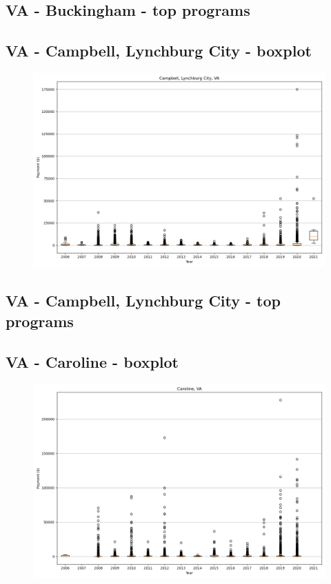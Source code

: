 \subsection*{VA - Buckingham - top programs}

\newpage
\subsection*{VA - Campbell, Lynchburg City - boxplot}
\begin{figure}[h]
\centering
\includegraphics[width=7in]{../output/boxplots/counties/Campbell, Lynchburg City-VA_boxplot.png}
\end{figure}


\subsection*{VA - Campbell, Lynchburg City - top programs}

\newpage
\subsection*{VA - Caroline - boxplot}
\begin{figure}[h]
\centering
\includegraphics[width=7in]{../output/boxplots/counties/Caroline-VA_boxplot.png}
\end{figure}


